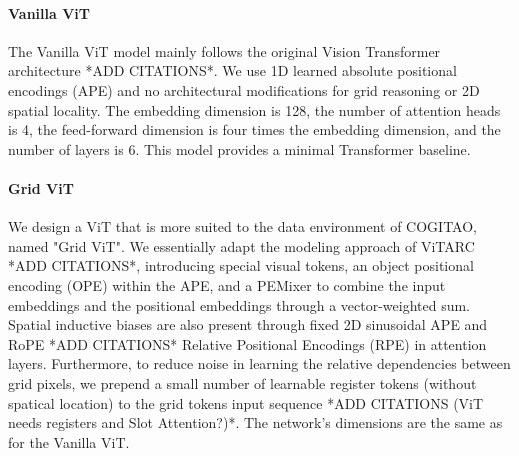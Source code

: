 \paragraph{Vanilla ViT}
The Vanilla ViT model mainly follows the original Vision Transformer architecture *ADD CITATIONS*. We use 1D learned absolute positional encodings (APE) and no architectural modifications for grid reasoning or 2D spatial locality. The embedding dimension is 128, the number of attention heads is 4, the feed-forward dimension is four times the embedding dimension, and the number of layers is 6. This model provides a minimal Transformer baseline.

\paragraph{Grid ViT}
We design a ViT that is more suited to the data environment of COGITAO, named "Grid ViT". We essentially adapt the modeling approach of ViTARC *ADD CITATIONS*, introducing special visual tokens, an object positional encoding (OPE) within the APE, and a PEMixer to combine the input embeddings and the positional embeddings through a vector-weighted sum. Spatial inductive biases are also present through fixed 2D sinusoidal APE and RoPE *ADD CITATIONS* Relative Positional Encodings (RPE) in attention layers. Furthermore, to reduce noise in learning the relative dependencies between grid pixels, we prepend a small number of learnable register tokens (without spatical location) to the grid tokens input sequence *ADD CITATIONS (ViT needs registers and Slot Attention?)*. The network's dimensions are the same as for the Vanilla ViT.


